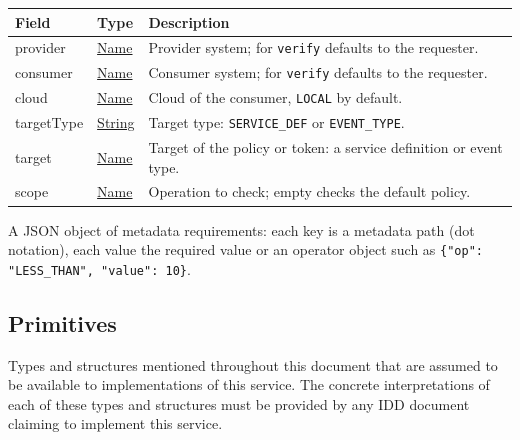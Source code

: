 \documentclass[a4paper]{arrowhead}
\newcommand{\pref}[1]{{\textcolor{ArrowheadGrey}{\hyperref[sec:model:primitives:#1]{#1}}}}
\begin{document}
\noindent\begin{tabularx}{\textwidth}{| >{\raggedright\arraybackslash}p{3.9cm} | >{\raggedright\arraybackslash\small}p{5.3cm} | X |} \hline
\rowcolor{gray!33} Field & Type & Description \\ \hline
provider & \pref{Name} & Provider system; for \texttt{verify} defaults to the requester. \\ \hline
consumer & \pref{Name} & Consumer system; for \texttt{verify} defaults to the requester. \\ \hline
cloud & \pref{Name} & Cloud of the consumer, \texttt{LOCAL} by default. \\ \hline
target\allowbreak{}Type & \pref{String} & Target type: \texttt{SERVICE\_\allowbreak{}DEF} or \texttt{EVENT\_\allowbreak{}TYPE}. \\ \hline
target & \pref{Name} & Target of the policy or token: a service definition or event type. \\ \hline
scope & \pref{Name} & Operation to check; empty checks the default policy. \\ \hline
\end{tabularx}




A JSON object of metadata requirements: each key is a metadata path (dot notation), each value the required value or an operator object such as \texttt{\{"op": "LESS\_\allowbreak{}THAN",\allowbreak{} "value": 10\}}.



\subsection{Primitives}
\label{sec:model:primitives}

Types and structures mentioned throughout this document that are assumed to be available to implementations of this service.
The concrete interpretations of each of these types and structures must be provided by any IDD document claiming to implement this service.
\end{document}
